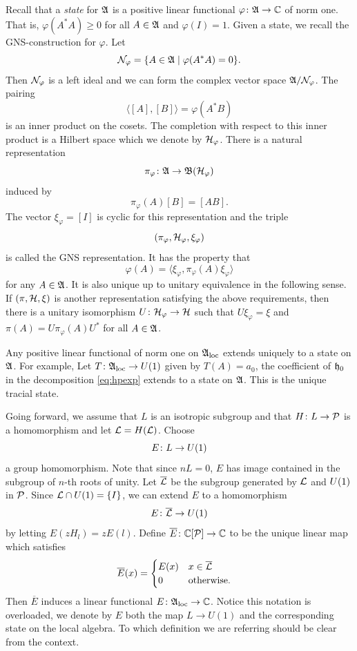 \documentclass[11pt]{amsart}
\begin{document}
Recall that a \emph{state} for $\mathfrak{A}$ is a positive linear functional $\varphi \colon \mathfrak{A} \to \mathbb{C}$ of norm one. That is,
$\varphi(A^*A)\geq 0$ for all $A\in \mathfrak{A}$ and $\varphi(I)=1$.
Given a state, we recall the GNS-construction for $\varphi$. Let
\[\mathcal{N}_\varphi =\{ A\in \mathfrak{A} \mid \varphi(A^*A)=0 \}.\]
Then $\mathcal{N}_\varphi$ is a left ideal and we can form the complex vector space $\mathfrak{A}/\mathcal{N}_\varphi$. The pairing
\[ \langle [A], [B] \rangle =\varphi(A^*B)\]
is an inner product on the cosets. The completion with respect to this inner product is a Hilbert space which we denote by $\mathcal{H}_\varphi$. There is a natural representation
\[\pi_\varphi \colon \mathfrak{A} \to \mathfrak{B}(\mathcal{H}_\varphi)\]
induced by
\[\pi_\varphi(A)[B] = [AB].\]
The vector $\xi_\varphi = [I]$ is cyclic for this representation and the triple
\[(\pi_\varphi, \mathcal{H}_\varphi, \xi_\varphi)\] is called the GNS representation. It has the property that
\[ \varphi(A)=\langle \xi_\varphi, \pi_\varphi(A)\xi_\varphi\rangle \]
for any $A\in \mathfrak{A}$. It is also unique up to unitary equivalence in the following sense. If $(\pi,\mathcal{H}, \xi)$ is another representation satisfying the above requirements, then there is a unitary isomorphism $U \colon \mathcal{H}_\varphi \to \mathcal{H}$ such that $U\xi_\varphi=\xi$ and $\pi(A)=U\pi_\varphi(A)U^*$ for all $A\in \mathfrak{A}$.

\begin{example}
Any positive linear functional of norm one  on $\mathfrak{A}_{\mathrm{loc}}$ extends uniquely to a state on $\mathfrak{A}$. For example,
Let $T \colon \mathfrak{A}_{\mathrm{loc}} \to U(1)$ given by $T(A) = a_0$, the coefficient of $\mathfrak{h}_0$ in the decomposition \eqref{eq:hpexp} extends to a state on $\mathfrak{A}$. This is the unique tracial state.
\end{example}

Going forward, we assume that $L$ is an isotropic subgroup and that $H \colon L \to \mathcal{P}$ is a homomorphism and let $ \mathcal{L} =H(\mathcal{L})$.
Choose
\[E \colon L \to  U(1)\]
a group homomorphism. Note that since $nL=0$, $E$ has image contained in the subgroup of $n$-th  roots of unity.
Let $\overline{\mathcal{L}}$ be the subgroup generated by $\mathcal{L}$ and $U(1)$ in $\mathcal{P}$. Since $\mathcal{L} \cap U(1) = \{I\}$, we can extend $E$ to a homomorphism
\[ E \colon \overline{\mathcal{L}} \to U(1)\]
by letting $E(z H_l) = zE(l)$. Define $\overline{E} \colon \mathbb{C}[\mathcal{P}] \to \mathbb{C}$ to be the unique linear map which satisfies
\begin{align*}
\overline{E}(x) &= \begin{cases}
E(x) &  x \in   \overline{\mathcal{L}}   \\
0 & \text{otherwise.}
\end{cases}
\end{align*}
Then $\overline{E}$ induces a linear functional $E \colon \mathfrak{A}_{\mathrm{loc}} \to \mathbb{C}$. Notice this notation is overloaded, we denote by $E$ both the map $L\to U(1)$ and the corresponding state on the local algebra. To which definition we are referring should be clear from the context.
\end{document}
